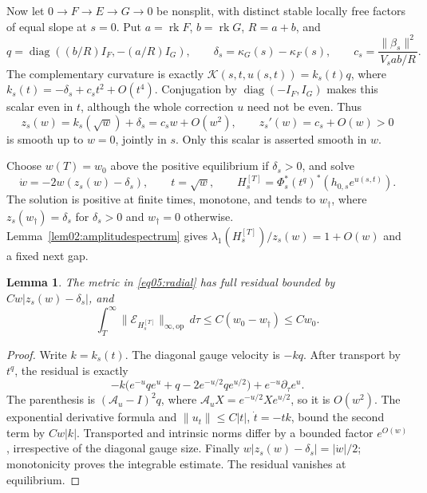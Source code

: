 \documentclass[11pt]{amsart}
\newtheorem{lemma}[theorem]{Lemma}
\theoremstyle{definition}
\theoremstyle{remark}
\newcommand{\cK}{\mathcal K}
\newcommand{\rk}{\operatorname{rk}}
\newcommand{\diag}{\operatorname{diag}}
\begin{document}
Now let \(0\to F\to E\to G\to0\) be nonsplit, with distinct
stable locally free factors of equal slope at \(s=0\). Put
\(a=\rk F\), \(b=\rk G\), \(R=a+b\), and
\begin{equation}\label{eq05:radialdata}
 q=\diag((b/R)I_F,-(a/R)I_G),\qquad
 \delta_s=\kappa_G(s)-\kappa_F(s),\qquad
 c_s=\frac{\|\beta_s\|^2}{V_sab/R}.
\end{equation}
The complementary curvature is exactly
\(\cK(s,t,u(s,t))=k_s(t)q\), where
\(k_s(t)=-\delta_s+c_st^2+O(t^4)\). Conjugation by
\(\diag(-I_F,I_G)\) makes this scalar even in \(t\), although
the whole correction \(u\) need not be even. Thus
\begin{equation}\label{eq05:calibrated}
 z_s(w)=k_s(\sqrt w)+\delta_s=c_sw+O(w^2),\qquad
 z_s'(w)=c_s+O(w)>0
\end{equation}
is smooth up to \(w=0\), jointly in \(s\). Only this scalar is
asserted smooth in \(w\).

Choose \(w(T)=w_0\) above the positive equilibrium if
\(\delta_s>0\), and solve
\begin{equation}\label{eq05:radial}
 \dot w=-2w(z_s(w)-\delta_s),\qquad t=\sqrt w,
 \qquad H_s^{[T]}=\Phi_s^*(t^q)^*(h_{0,s}e^{u(s,t)}).
\end{equation}
The solution is positive at finite times, monotone, and tends to
\(w_\dagger\), where \(z_s(w_\dagger)=\delta_s\) for
\(\delta_s>0\) and \(w_\dagger=0\) otherwise.
Lemma~\ref{lem02:amplitudespectrum} gives
\(\lambda_1(H_s^{[T]})/z_s(w)=1+O(w)\) and a fixed next gap.

\begin{lemma}\label{lem05:residual}
The metric in \eqref{eq05:radial} has full residual bounded by
\(Cw|z_s(w)-\delta_s|\), and
\begin{equation}\label{eq05:integrable}
 \int_T^\infty\|\mathcal E_{H_s^{[T]}}\|_{\infty,\mathrm{op}}
 \,d\tau\le C(w_0-w_\dagger)\le Cw_0.
\end{equation}
\end{lemma}

\begin{proof}
Write \(k=k_s(t)\). The diagonal gauge velocity is \(-kq\).
After transport by \(t^q\), the residual is exactly
\[
 -k\bigl(e^{-u}qe^u+q-2e^{-u/2}qe^{u/2}\bigr)
                  +e^{-u}\partial_\tau e^u.
\]
The parenthesis is \((\mathcal A_u-I)^2q\), where
\(\mathcal A_uX=e^{-u/2}Xe^{u/2}\), so it is \(O(w^2)\).
The exponential derivative formula and
\(\|u_t\|\le C|t|\), \(\dot t=-tk\), bound the second term
by \(Cw|k|\). Transported and intrinsic norms differ by a bounded
factor \(e^{O(w)}\), irrespective of the diagonal gauge size.
Finally \(w|z_s(w)-\delta_s|=|\dot w|/2\); monotonicity proves
the integrable estimate. The residual vanishes at equilibrium.
\end{proof}
\end{document}
